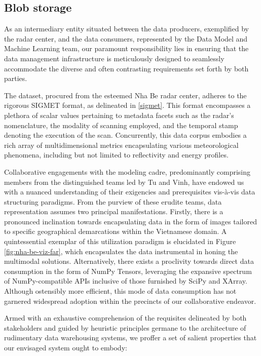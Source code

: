 
\subsection{Blob storage}
As an intermediary entity situated between the data producers, exemplified by
the radar center, and the data consumers, represented by the Data Model and
Machine Learning team, our paramount responsibility lies in ensuring that the
data management infrastructure is meticulously designed to seamlessly
accommodate the diverse and often contrasting requirements set forth by both
parties.

The dataset, procured from the esteemed Nha Be radar center, adheres to the
rigorous SIGMET format, as delineated in \ref{sigmet}. This format encompasses a
plethora of scalar values pertaining to metadata facets such as the radar's
nomenclature, the modality of scanning employed, and the temporal stamp denoting
the execution of the scan. Concurrently, this data corpus embodies a rich array
of multidimensional metrics encapsulating various meteorological phenomena,
including but not limited to reflectivity and energy profiles.

Collaborative engagements with the modeling cadre, predominantly comprising
members from the distinguished teams led by Tu and Vinh, have endowed us with a
nuanced understanding of their exigencies and prerequisites vis-à-vis data
structuring paradigms. From the purview of these erudite teams, data
representation assumes two principal manifestations. Firstly, there is a
pronounced inclination towards encapsulating data in the form of images tailored
to specific geographical demarcations within the Vietnamese domain. A
quintessential exemplar of this utilization paradigm is elucidated in Figure
\ref{fig:nha-be-viz-far}, which encapsulates the data instrumental in honing the
multimodal solutions. Alternatively, there exists a proclivity towards direct
data consumption in the form of NumPy Tensors, leveraging the expansive spectrum
of NumPy-compatible APIs inclusive of those furnished by SciPy and XArray.
Although ostensibly more efficient, this mode of data consumption has not
garnered widespread adoption within the precincts of our collaborative endeavor.

Armed with an exhaustive comprehension of the requisites delineated by both
stakeholders and guided by heuristic principles germane to the architecture of
rudimentary data warehousing systems, we proffer a set of salient properties
that our envisaged system ought to embody:

